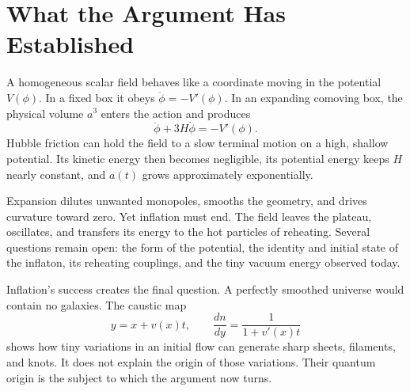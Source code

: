 \section{What the Argument Has Established}

A homogeneous scalar field behaves like a coordinate moving in the potential \(V(\phi)\). In a fixed box it obeys \(\ddot\phi=-V'(\phi)\). In an expanding comoving box, the physical volume \(a^3\) enters the action and produces
\[
\ddot\phi+3H\dot\phi=-V'(\phi).
\]
Hubble friction can hold the field to a slow terminal motion on a high, shallow potential. Its kinetic energy then becomes negligible, its potential energy keeps \(H\) nearly constant, and \(a(t)\) grows approximately exponentially.

Expansion dilutes unwanted monopoles, smooths the geometry, and drives curvature toward zero. Yet inflation must end. The field leaves the plateau, oscillates, and transfers its energy to the hot particles of reheating. Several questions remain open: the form of the potential, the identity and initial state of the inflaton, its reheating couplings, and the tiny vacuum energy observed today.

Inflation's success creates the final question. A perfectly smoothed universe would contain no galaxies. The caustic map
\[
y=x+v(x)t,
\qquad
\frac{dn}{dy}=\frac{1}{1+v'(x)t}
\]
shows how tiny variations in an initial flow can generate sharp sheets, filaments, and knots. It does not explain the origin of those variations. Their quantum origin is the subject to which the argument now turns.
